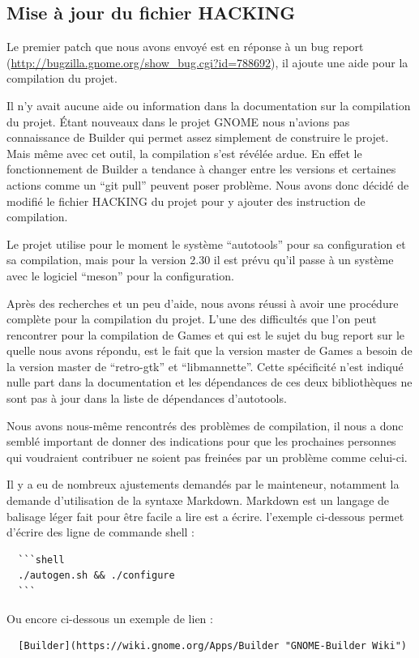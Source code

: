 \documentclass[12pt]{report}
\begin{document}
\subsection{Mise à jour du fichier HACKING}
\label{HACKING}
Le premier patch que nous avons envoyé est en réponse à un bug report
(\url{http://bugzilla.gnome.org/show_bug.cgi?id=788692}), il ajoute une aide
pour la compilation du projet.

Il n'y avait aucune aide ou information dans la documentation sur la compilation
du projet. Étant nouveaux dans le projet GNOME nous n'avions pas connaissance de 
Builder qui permet assez simplement de construire le projet. Mais même avec cet
outil, la compilation s'est révélée ardue. En effet le fonctionnement de Builder a
tendance à changer entre les versions et certaines actions comme un ``git pull''
peuvent poser problème. Nous avons donc décidé de modifié le fichier HACKING du
projet pour y ajouter des instruction de compilation.

Le projet utilise pour le moment le système ``autotools'' pour sa configuration et 
sa compilation, mais pour la version 2.30 il est prévu qu'il passe à un système
avec le logiciel ``meson'' pour la configuration.

Après des recherches et un peu d'aide, nous avons réussi à avoir une procédure
complète pour la compilation du projet. L'une des difficultés que l'on peut
rencontrer pour la compilation de Games et qui est le sujet du bug report sur le
quelle nous avons répondu, est le fait que la version master de Games a besoin de
la version master de ``retro-gtk'' et ``libmannette''. Cette spécificité n'est
indiqué nulle part dans la documentation et les dépendances de ces deux
bibliothèques ne sont pas à jour dans la liste de dépendances d'autotools.

Nous avons nous-même rencontrés des problèmes de compilation, il nous a donc
semblé important de donner des indications pour que les prochaines personnes qui
voudraient contribuer ne soient pas freinées par un problème comme celui-ci.

Il y a eu de nombreux ajustements demandés par le mainteneur, notamment la demande
d'utilisation de la syntaxe Markdown.
Markdown est un langage de balisage léger fait pour être facile a lire est a écrire.
l'exemple ci-dessous permet d'écrire des ligne de commande shell :
\begin{verbatim}
  ```shell
  ./autogen.sh && ./configure
  ```
\end{verbatim}
Ou encore ci-dessous un exemple de lien :
\begin{verbatim}
  [Builder](https://wiki.gnome.org/Apps/Builder "GNOME-Builder Wiki")
\end{verbatim}
\end{document}
